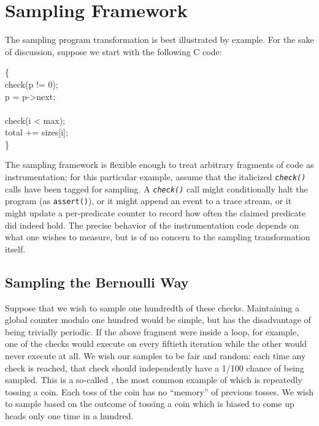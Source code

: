 \section{Sampling Framework}
\label{sec:framework}

The sampling program transformation is best illustrated by example.
For the sake of discussion, suppose we start with the following C
code:

\begin{code}
  \{\+ \\
  check(p != 0); \\
  \up p = p->next; \\
  \\
  check(i < max); \\
  \up total += sizes[i]; \\
  \<\}
\end{code}

The sampling framework is flexible enough to treat arbitrary fragments
of code as instrumentation; for this particular example, assume that
the italicized \texttt{\textit{check()}} calls have been tagged for
sampling.  A \texttt{\textit{check()}} call might conditionally halt
the program (as \texttt{assert()}), or it might append an event to a
trace stream, or it might update a per-predicate counter to record how
often the claimed predicate did indeed hold.  The precise behavior of
the instrumentation code depends on what one wishes to measure, but is
of no concern to the sampling transformation itself.

\subsection{Sampling the Bernoulli Way}

Suppose that we wish to sample one hundredth of these checks.
Maintaining a global counter modulo one hundred would be simple, but
has the disadvantage of being trivially periodic.  If the above
fragment were inside a loop, for example, one of the checks would
execute on every fiftieth iteration while the other would never
execute at all.  We wish our samples to be fair and random: each time
any check is reached, that check should independently have a 1/100
chance of being sampled.  This is a so-called , the most common example of which is repeatedly tossing a
coin.  Each toss of the coin has no ``memory'' of previous tosses.  We
wish to sample based on the outcome of tossing a coin which is biased
to come up heads only one time in a hundred.

